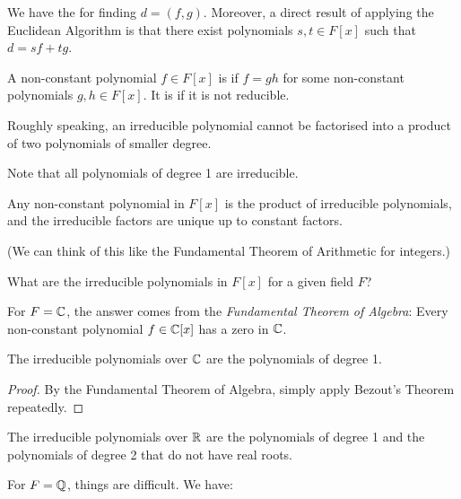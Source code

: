We have the  for finding $d = (f, g)$. Moreover, a direct result of applying the Euclidean Algorithm is that there exist polynomials $s, t \in F[x]$ such that $d = sf + tg$.

\begin{definition}
	A non-constant polynomial $f \in F[x]$ is  if $f = gh$ for some non-constant polynomials $g, h \in F[x]$. It is  if it is not reducible.
\end{definition}

Roughly speaking, an irreducible polynomial cannot be factorised into a product of two polynomials of smaller degree.

Note that all polynomials of degree 1 are irreducible.

\begin{theorem}
	Any non-constant polynomial in $F[x]$ is the product of irreducible polynomials, and the irreducible factors are unique up to constant factors.
	
	(We can think of this like the Fundamental Theorem of Arithmetic for integers.)
\end{theorem}

What are the irreducible polynomials in $F[x]$ for a given field $F$?

For $F = \mathbb{C}$, the answer comes from the \emph{Fundamental Theorem of Algebra}: Every non-constant polynomial $f \in \mathbb{C}[x]$ has a zero in $\mathbb{C}$.

\begin{corollary}
	The irreducible polynomials over $\mathbb{C}$ are the polynomials of degree 1.
	\begin{proof}
		By the Fundamental Theorem of Algebra, simply apply Bezout's Theorem repeatedly.
	\end{proof}
\end{corollary}

\begin{corollary}
	The irreducible polynomials over $\mathbb{R}$ are the polynomials of degree 1 and the polynomials of degree 2 that do not have real roots.
\end{corollary}

For $F = \mathbb{Q}$, things are difficult. We have:

